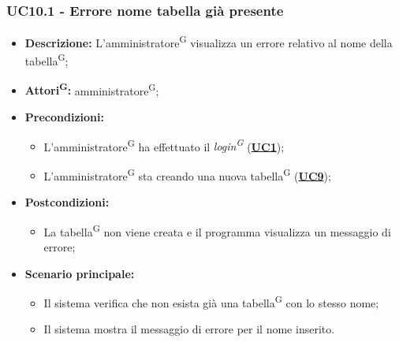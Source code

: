 \subsubsection{UC10.1 - Errore nome tabella già presente}
\label{sec:UC10.1}
\begin{itemize}
	\item \textbf{Descrizione:} L’amministratore\textsuperscript{G} visualizza un errore relativo al nome della tabella\textsuperscript{G};
	\item \textbf{Attori\textsuperscript{G}:} amministratore\textsuperscript{G};
	\item \textbf{Precondizioni:} 
	\begin{itemize}
		\item L’amministratore\textsuperscript{G} ha effettuato il \textit{login\textsuperscript{G}} (\hyperref[sec:UC1]{\textbf{UC1}});
		\item L’amministratore\textsuperscript{G} sta creando una nuova tabella\textsuperscript{G} (\hyperref[sec:UC9]{\textbf{UC9}});
	\end{itemize}
	\item \textbf{Postcondizioni:} 
	\begin{itemize}
		\item La tabella\textsuperscript{G} non viene creata e il programma visualizza un messaggio di errore;
	\end{itemize}
	\item \textbf{Scenario principale:} 
	\begin{itemize}
		\item Il sistema verifica che non esista già una tabella\textsuperscript{G} con lo stesso nome;
		\item Il sistema mostra il messaggio di errore per il nome inserito.
	\end{itemize}
\end{itemize}

